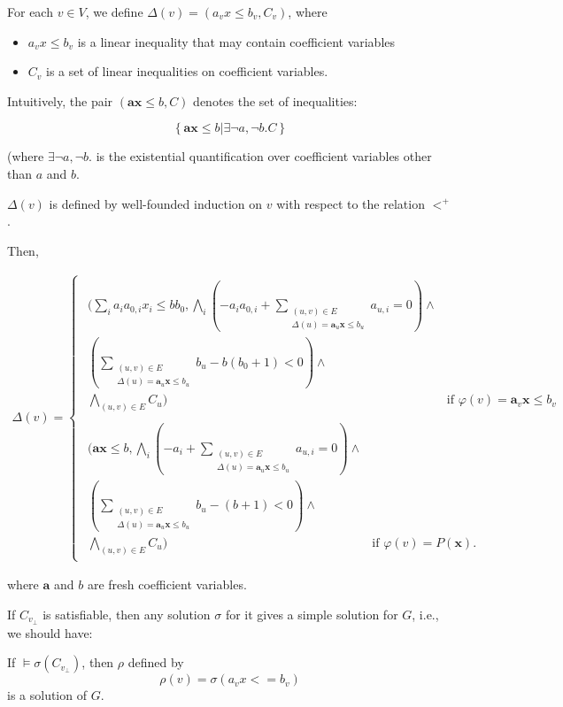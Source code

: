 \documentclass[a4paper,12pt]{article}
\begin{document}
For each $v \in V$, we define $\Delta(v) = (a_v x \leq b_v, C_v)$,
where
\begin{itemize}
\item $a_v x \leq b_v$ is a linear inequality that may contain
  coefficient variables
\item $C_v$ is a set of linear inequalities on coefficient variables.
\end{itemize}
Intuitively, the pair $(\mathbf{a} \mathbf{x} \leq b, C)$ denotes the
set of inequalities:

\[ \left\lbrace \mathbf{a} \mathbf{x} \leq b | \exists \neg a,\neg
b. C \right\rbrace \]

(where $\exists \neg a, \neg b.$ is the existential quantification
over coefficient variables other than $a$ and $b$.

$\Delta(v)$ is defined by well-founded induction on $v$ with respect
to the relation $<^+$.

Then,

\begin{align*}
\Delta(v) =
\begin{cases}
\begin{split}
\Bigg(
\sum_i { a_i a_{0,i} x_i } \leq b b_0,
\bigwedge_i \left( - a_i a_{0,i} + \sum_{\substack{(u,v) \in E \\ \Delta(u)=\mathbf{a}_u \mathbf{x} \leq b_u}} a_{u,i} = 0 \right) \wedge \\
\left( \sum_{\substack{(u,v) \in E \\ \Delta(u)=\mathbf{a}_u \mathbf{x} \leq b_u}} b_u - b (b_0+1) < 0 \right) \wedge \\
\bigwedge_{(u,v) \in E} C_u
\Bigg)
& \mbox{if } \varphi(v) = \mathbf{a}_v \mathbf{x} \leq b_v
\end{split}
 \\
\begin{split}
\Bigg(
\mathbf{a} \mathbf{x} \leq b,
\bigwedge_i \left( - a_i + \sum_{\substack{(u,v) \in E \\ \Delta(u)=\mathbf{a}_u \mathbf{x} \leq b_u}} a_{u,i} = 0 \right) \wedge \\
\left( \sum_{\substack{(u,v) \in E \\ \Delta(u)=\mathbf{a}_u \mathbf{x} \leq b_u}} b_u - (b+1) < 0 \right) \wedge \\
\bigwedge_{(u,v) \in E} C_u
\Bigg)
& \mbox{if } \varphi(v) = P(\mathbf{x}).
\end{split}
\end{cases}
\end{align*}

where $\mathbf{a}$ and $b$ are fresh coefficient variables.

If $C_{v_\bot}$ is satisfiable, then any solution $\sigma$ for it
gives a simple solution for $G$, i.e., we should have:

If $\models \sigma(C_{v_\bot})$, then $\rho$ defined by
\[ \rho(v)= \sigma(a_v x <= b_v) \]
is a solution of $G$.
\end{document}
